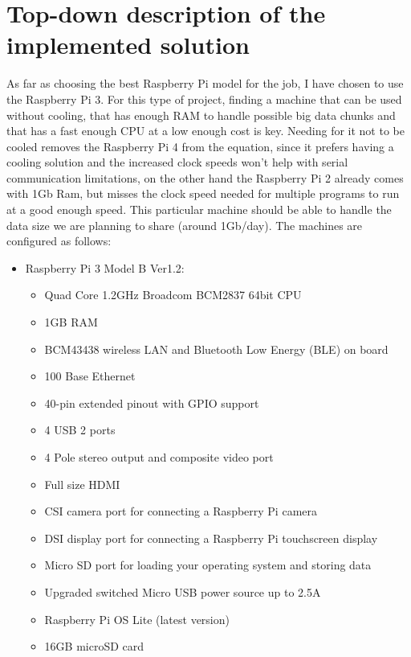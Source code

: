 \documentclass[a4paper, 12pt]{book}
\begin{document}
\section{Top-down description of the implemented solution}
As far as choosing the best Raspberry Pi model for the job, I have chosen to use the Raspberry Pi 3. For this type of project, finding a machine that can be used without cooling, that has enough RAM to handle possible big data chunks and that has a fast enough CPU at a low enough cost is key. Needing for it not to be cooled removes the Raspberry Pi 4 from the equation, since it prefers having a cooling solution and the increased clock speeds won't help with serial communication limitations, on the other hand the Raspberry Pi 2 already comes with 1Gb Ram, but misses the clock speed needed for multiple programs to run at a good enough speed.
This particular machine should be able to handle the data size we are planning to share (around 1Gb/day). The machines are configured as follows:
\begin{itemize}
    \item Raspberry Pi 3 Model B Ver1.2:
    \begin{itemize}
        \item Quad Core 1.2GHz Broadcom BCM2837 64bit CPU
        \item 1GB RAM
        \item BCM43438 wireless LAN and Bluetooth Low Energy (BLE) on board
        \item 100 Base Ethernet
        \item 40-pin extended pinout with GPIO support
        \item 4 USB 2 ports
        \item 4 Pole stereo output and composite video port
        \item Full size HDMI
        \item CSI camera port for connecting a Raspberry Pi camera
        \item DSI display port for connecting a Raspberry Pi touchscreen display
        \item Micro SD port for loading your operating system and storing data
        \item Upgraded switched Micro USB power source up to 2.5A
        \item Raspberry Pi OS Lite (latest version)
        \item 16GB microSD card
    \end{itemize}
\end{itemize}
\end{document}
